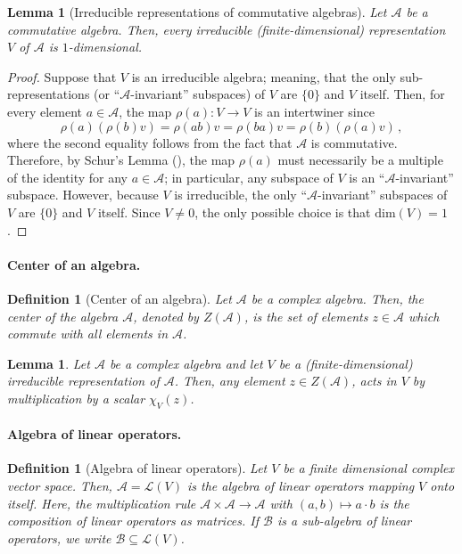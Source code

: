 \documentclass[12pt]{article}
\theoremstyle{plain}
\newtheorem{lemma}[theorem]{Lemma}
\newtheorem{definition}[theorem]{Definition}
\begin{document}
\begin{lemma}[Irreducible representations of commutative algebras]
Let $\mathcal{A}$ be a commutative algebra. Then, every irreducible (finite-dimensional) representation $V$ of $\mathcal{A}$ is $1$-dimensional.
\end{lemma}
\begin{proof}
Suppose that $V$ is an irreducible algebra; meaning, that the only sub-representations (or ``$\mathcal{A}$-invariant'' subspaces) of $V$ are $\{0\}$ and $V$ itself. Then, for every element $a \in \mathcal{A}$, the map $\rho(a): V \rightarrow V$ is an intertwiner since
$$
\rho(a)(\rho(b) v) =  \rho(ab) v = \rho(ba) v = \rho(b)(\rho(a) v) \, ,
$$
where the second equality follows from the fact that $\mathcal{A}$ is commutative. Therefore, by Schur's Lemma (), the map $\rho(a)$ must necessarily be a multiple of the identity for any $a \in \mathcal{A}$; in particular, any subspace of $V$ is an ``$\mathcal{A}$-invariant'' subspace.  However, because $V$ is irreducible, the only ``$\mathcal{A}$-invariant'' subspaces of $V$ are $\{0\}$ and $V$ itself. Since $V \neq 0$, the only possible choice is that $\mathrm{dim}(V)=1$.
\end{proof}

\paragraph{Center of an algebra.}

\begin{definition}[Center of an algebra]
Let $\mathcal{A}$ be a complex algebra. 
Then, the center of the algebra $\mathcal{A}$, denoted by $Z(\mathcal{A})$, is the set of elements $z \in \mathcal{A}$ which commute with all elements in $\mathcal{A}$.   
\end{definition}

\begin{lemma}
Let $\mathcal{A}$ be a complex algebra and let $V$ be a (finite-dimensional) irreducible representation of $\mathcal{A}$. Then, any element $z \in Z(\mathcal{A})$, acts in $V$ by multiplication by a scalar $\chi_V(z)$.
\end{lemma}

\paragraph{Algebra of linear operators.}

\begin{definition}[Algebra of linear operators]
Let $V$ be a finite dimensional complex vector space. Then, $\mathcal{A} = \mathcal{L}(V)$ is the algebra of linear operators mapping $V$ onto itself. Here, the multiplication rule
$\mathcal{A} \times \mathcal{A} \rightarrow \mathcal{A}$ with $(a,b) \mapsto a \cdot b$
is the composition of linear operators as matrices. If $\mathcal{B}$ is a sub-algebra of linear operators, we write $\mathcal{B} \subseteq \mathcal{L}(V)$. 
\end{definition}
\end{document}
